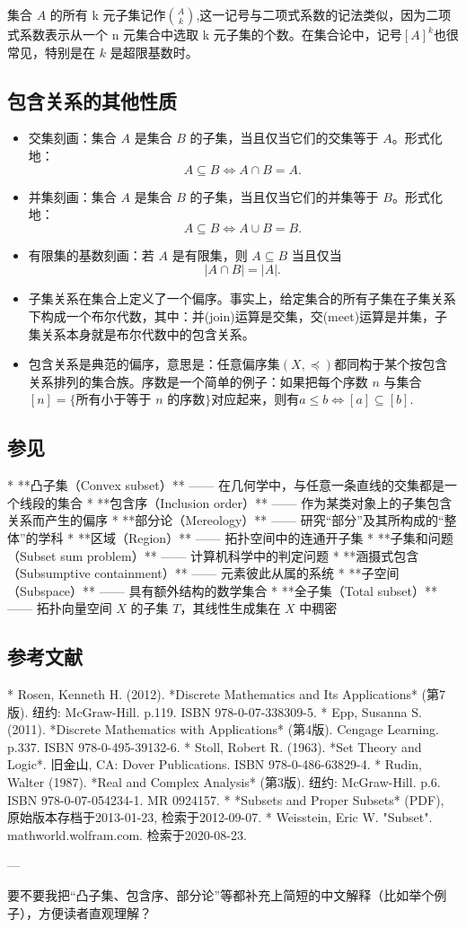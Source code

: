 集合 $A$ 的所有 k 元子集记作$\binom{A}{k}$,这一记号与二项式系数的记法类似，因为二项式系数表示从一个 n 元集合中选取 k 元子集的个数。在集合论中，记号$[A]^k$也很常见，特别是在 $k$ 是超限基数时。
\subsection{包含关系的其他性质}
\begin{itemize}
\item 交集刻画：集合 $A$ 是集合 $B$ 的子集，当且仅当它们的交集等于 $A$。形式化地：
$$
A \subseteq B \iff A \cap B = A.~
$$
\item 并集刻画：集合 $A$ 是集合 $B$ 的子集，当且仅当它们的并集等于 $B$。形式化地：
$$
A \subseteq B \iff A \cup B = B.~
$$
\item 有限集的基数刻画：若 $A$ 是有限集，则 $A \subseteq B$ 当且仅当
$$
|A \cap B| = |A|.~
$$
\item 子集关系在集合上定义了一个偏序。事实上，给定集合的所有子集在子集关系下构成一个布尔代数，其中：并(join)运算是交集，交(meet)运算是并集，子集关系本身就是布尔代数中的包含关系。
\item 包含关系是典范的偏序，意思是：任意偏序集$(X, \preceq)$都同构于某个按包含关系排列的集合族。序数是一个简单的例子：如果把每个序数 $n$ 与集合$[n] = \{ \text{所有小于等于 } n \text{ 的序数} \}$对应起来，则有$a \leq b \iff [a] \subseteq [b]$.
\end{itemize}
\subsection{参见}

* **凸子集（Convex subset）** —— 在几何学中，与任意一条直线的交集都是一个线段的集合
* **包含序（Inclusion order）** —— 作为某类对象上的子集包含关系而产生的偏序
* **部分论（Mereology）** —— 研究“部分”及其所构成的“整体”的学科
* **区域（Region）** —— 拓扑空间中的连通开子集
* **子集和问题（Subset sum problem）** —— 计算机科学中的判定问题
* **涵摄式包含（Subsumptive containment）** —— 元素彼此从属的系统
* **子空间（Subspace）** —— 具有额外结构的数学集合
* **全子集（Total subset）** —— 拓扑向量空间 $X$ 的子集 $T$，其线性生成集在 $X$ 中稠密

\subsection{参考文献}

* Rosen, Kenneth H. (2012). *Discrete Mathematics and Its Applications* (第7版). 纽约: McGraw-Hill. p.119. ISBN 978-0-07-338309-5.
* Epp, Susanna S. (2011). *Discrete Mathematics with Applications* (第4版). Cengage Learning. p.337. ISBN 978-0-495-39132-6.
* Stoll, Robert R. (1963). *Set Theory and Logic*. 旧金山, CA: Dover Publications. ISBN 978-0-486-63829-4.
* Rudin, Walter (1987). *Real and Complex Analysis* (第3版). 纽约: McGraw-Hill. p.6. ISBN 978-0-07-054234-1. MR 0924157.
* *Subsets and Proper Subsets* (PDF), 原始版本存档于2013-01-23, 检索于2012-09-07.
* Weisstein, Eric W. "Subset". mathworld.wolfram.com. 检索于2020-08-23.

---

要不要我把“凸子集、包含序、部分论”等都补充上简短的中文解释（比如举个例子），方便读者直观理解？
